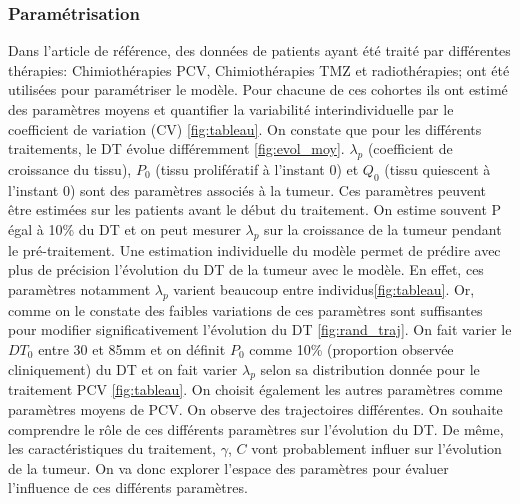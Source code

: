 \documentclass[12pt,a4paper]{article}
\begin{document}
\subsubsection{Paramétrisation}
Dans l'article de référence, des données de patients ayant été traité par différentes thérapies: Chimiothérapies PCV, Chimiothérapies TMZ et radiothérapies; ont été utilisées pour paramétriser le modèle. Pour chacune de ces cohortes ils ont estimé des paramètres moyens et quantifier la variabilité interindividuelle par le coefficient de variation (CV) \ref{fig:tableau}.  On constate que pour les différents traitements, le DT évolue différemment \ref{fig:evol_moy}. $\lambda_{p}$ (coefficient de croissance du tissu), $P_{0}$ (tissu prolifératif à l'instant 0) et $Q_{0}$ (tissu quiescent à l'instant 0) sont des paramètres associés à la tumeur.  Ces paramètres peuvent être estimées sur les patients avant le début du traitement. On estime souvent P égal à 10\% du DT et on peut mesurer $\lambda_{p}$ sur la croissance de la tumeur pendant le pré-traitement. Une estimation individuelle du modèle permet de prédire avec plus de précision l'évolution du DT de la tumeur avec le modèle. En effet, ces paramètres notamment $\lambda_{p}$ varient beaucoup entre individus\ref{fig:tableau}. Or, comme on le constate des faibles variations de ces paramètres sont suffisantes pour modifier significativement  l'évolution du DT \ref{fig:rand_traj}. On fait varier le $DT_{0}$ entre 30 et 85mm et on définit $P_{0}$ comme 10\% (proportion observée cliniquement) du DT et on fait varier $\lambda_{p}$ selon sa distribution donnée pour le traitement PCV \ref{fig:tableau}. On choisit également les autres paramètres comme paramètres moyens de PCV. On observe des trajectoires différentes.  On  souhaite comprendre le rôle de ces différents paramètres sur l'évolution du DT. De même, les caractéristiques du traitement, $\gamma$, $C$ vont probablement influer sur l'évolution de la tumeur. On va donc explorer l'espace des paramètres pour évaluer l'influence de ces différents paramètres.  
\end{document}

